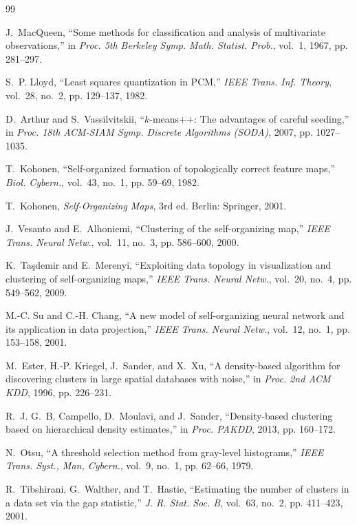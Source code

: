 \documentclass[journal]{IEEEtran}
\begin{document}

\begin{thebibliography}{99}

J.~MacQueen, ``Some methods for classification and analysis of multivariate observations,'' in \emph{Proc. 5th Berkeley Symp. Math. Statist. Prob.}, vol.~1, 1967, pp. 281--297.

S.~P. Lloyd, ``Least squares quantization in PCM,'' \emph{IEEE Trans. Inf. Theory}, vol.~28, no.~2, pp. 129--137, 1982.

D.~Arthur and S.~Vassilvitskii, ``$k$-means++: The advantages of careful seeding,'' in \emph{Proc. 18th ACM-SIAM Symp. Discrete Algorithms (SODA)}, 2007, pp. 1027--1035.

T.~Kohonen, ``Self-organized formation of topologically correct feature maps,'' \emph{Biol. Cybern.}, vol.~43, no.~1, pp. 59--69, 1982.

T.~Kohonen, \emph{Self-Organizing Maps}, 3rd ed. Berlin: Springer, 2001.

J.~Vesanto and E.~Alhoniemi, ``Clustering of the self-organizing map,'' \emph{IEEE Trans. Neural Netw.}, vol.~11, no.~3, pp. 586--600, 2000.

K.~Taşdemir and E.~Merenyi, ``Exploiting data topology in visualization and clustering of self-organizing maps,'' \emph{IEEE Trans. Neural Netw.}, vol.~20, no.~4, pp. 549--562, 2009.

M.-C. Su and C.-H. Chang, ``A new model of self-organizing neural network and its application in data projection,'' \emph{IEEE Trans. Neural Netw.}, vol.~12, no.~1, pp. 153--158, 2001.

M.~Ester, H.-P. Kriegel, J.~Sander, and X.~Xu, ``A density-based algorithm for discovering clusters in large spatial databases with noise,'' in \emph{Proc. 2nd ACM KDD}, 1996, pp. 226--231.

R.~J. G.~B. Campello, D.~Moulavi, and J.~Sander, ``Density-based clustering based on hierarchical density estimates,'' in \emph{Proc. PAKDD}, 2013, pp. 160--172.

N.~Otsu, ``A threshold selection method from gray-level histograms,'' \emph{IEEE Trans. Syst., Man, Cybern.}, vol.~9, no.~1, pp. 62--66, 1979.

R.~Tibshirani, G.~Walther, and T.~Hastie, ``Estimating the number of clusters in a data set via the gap statistic,'' \emph{J. R. Stat. Soc. B}, vol.~63, no.~2, pp. 411--423, 2001.


\end{thebibliography}
\end{document}
